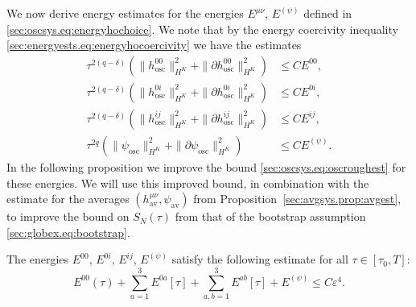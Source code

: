 \documentclass{article}
\newcommand{\osc}{\mathrm{osc}}
\newcommand{\av}{\mathrm{av}}
\newcommand{\ve}{\varepsilon}
\newcommand{\pa}{\partial}
\begin{document}
We now derive energy estimates for the energies $E^{\mu\nu}$, $E^{(\psi)}$ defined in \eqref{sec:oscsys.eq:energyhochoice}. We note that by the energy coercivity inequality \eqref{sec:energyests.eq:energyhocoercivity} we have the estimates
\begin{subequations}\label{sec:oscsys.eq:energyequiv}
    \begin{align}
        \tau^{2(q-\delta)}(\|h_{\osc}^{00}\|_{H^K}^2 + \|\pa h_{\osc}^{00}\|_{H^K}^2) &\leq CE^{00},\\
        \tau^{2(q-\delta)}(\|h_{\osc}^{0i}\|_{H^K}^2 + \|\pa h_{\osc}^{0i}\|_{H^K}^2) &\leq CE^{0i},\\
        \tau^{2(q-\delta)}(\|h_{\osc}^{ij}\|_{H^K}^2 + \|\pa h_{\osc}^{ij}\|_{H^K}^2) &\leq CE^{ij},\\
        \tau^{2q}(\|\psi_{\osc}\|_{H^K}^2 + \|\pa \psi_{\osc}\|_{H^K}^2) &\leq CE^{(\psi)}.
    \end{align}
\end{subequations}
In the following proposition we improve the bound \eqref{sec:oscsys.eq:oscroughest} for these energies. We will use this improved bound, in combination with the estimate for the averages $(h_{\av}^{\mu\nu},\psi_{\av})$ from Proposition~\ref{sec:avgsys.prop:avgest}, to improve the bound on $S_N(\tau)$ from that of the bootstrap assumption \eqref{sec:globex.eq:bootstrap}.
\begin{proposition}\label{sec:oscsys.prop:oscest}
    The energies $E^{00}$, $E^{0i}$, $E^{ij}$, $E^{(\psi)}$ satisfy the following estimate for all $\tau \in [\tau_0,T]$:
    \begin{equation}\label{sec:oscsys.eq:oscest}
        E^{00}(\tau) + \sum_{a=1}^3 E^{0a}[\tau] + \sum_{a,b=1}^3 E^{ab}[\tau] + E^{(\psi)} \leq C\ve^4.
    \end{equation}
\end{proposition}
\end{document}

